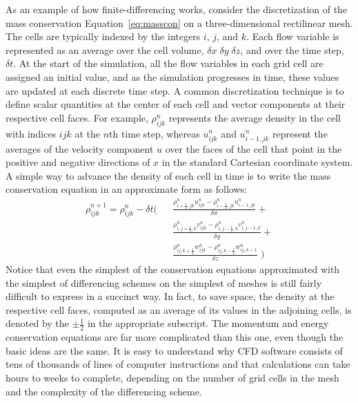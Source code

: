 \documentclass[graybox]{svmult}
\begin{document}
As an example of how finite-differencing works, consider the discretization of the mass conservation Equation~\ref{eq:masscon} on a three-dimensional rectilinear mesh. The cells are typically indexed by the integers $i$, $j$, and $k$. Each flow variable is represented as an average over the cell volume, $\delta x \; \delta y \; \delta z$, and over the time step, $\delta t$. At the start of the simulation, all the flow variables in each grid cell are assigned an initial value, and as the simulation progresses in time, these values are updated at each discrete time step. A common discretization  technique is to define scalar quantities at the center of each cell and vector components at their respective cell faces. For example, $\rho_{ijk}^n$ represents the average density in the cell with indices $ijk$ at the $n$th time step, whereas $u_{ijk}^n$  and $u_{i-1,jk}^n$ represent the averages of the velocity component $u$ over the faces of the cell that point in the positive and negative directions of $x$ in the standard Cartesian coordinate system. A simple way to advance the density of each cell in time is to write the mass conservation equation in an approximate form as follows:
\begin{eqnarray}
\rho_{ijk}^{n+1} = \rho_{ijk}^n  - \delta t \Big( && \frac{ \rho_{i+\frac{1}{2},jk}^n  u_{ijk}^n - \rho_{i-\frac{1}{2},jk}^n  u_{i-1,jk}^n }{\delta x} + \nonumber \\
                                                  && \frac{ \rho_{i,j+\frac{1}{2},k}^n v_{ijk}^n - \rho_{i,j-\frac{1}{2},k}^n v_{i,j-1,k}^n }{\delta y} + \label{eq:massdiff}  \\
                                                  && \frac{ \rho_{ij,k+\frac{1}{2}}^n  w_{ijk}^n - \rho_{ij,k-\frac{1}{2}}^n  w_{ij,k-1}^n }{\delta z} \; \Big) \nonumber
\end{eqnarray}
Notice that even the simplest of the conservation equations approximated with the simplest of differencing schemes on the simplest of meshes is still fairly difficult to express in a succinct way. In fact, to save space, the density at the respective cell faces, computed as an average of its values in the adjoining cells, is denoted by the $\pm \frac{1}{2}$ in the appropriate subscript. The momentum and energy conservation equations are far more complicated than this one, even though the basic ideas are the same. It is easy to understand why CFD software consists of tens of thousands of lines of computer instructions and that calculations can take hours to weeks to complete, depending on the number of grid cells in the mesh and the complexity of the differencing scheme.
\end{document}
